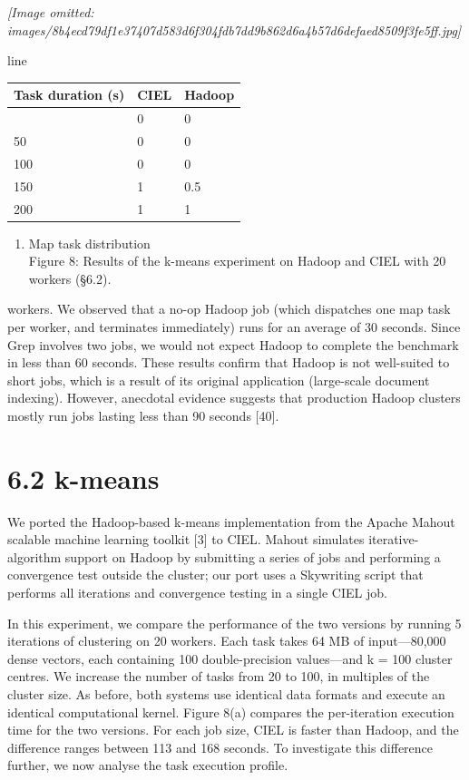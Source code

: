 \documentclass[
]{article}
\newcounter{none} %
\providecommand{\tightlist}{%
  \setlength{\itemsep}{0pt}\setlength{\parskip}{0pt}}
\begin{document}
\textit{[Image omitted: images/8b4ecd79df1e37407d583d6f304fdb7dd9b862d6a4b57d6defaed8509f3fe5ff.jpg]}

line

{\def\LTcaptype{none} %
\begin{longtable}[]{@{}lll@{}}
\toprule\noalign{}
Task duration (s) & CIEL & Hadoop \\
\midrule\noalign{}
\endhead
\bottomrule\noalign{}
\endlastfoot
0 & 0 & 0 \\
50 & 0 & 0 \\
100 & 0 & 0 \\
150 & 1 & 0.5 \\
200 & 1 & 1 \\
\end{longtable}
}

\begin{enumerate}
\def\labelenumi{(\alph{enumi})}
\setcounter{enumi}{2}
\tightlist
\item
  Map task distribution\\
  Figure 8: Results of the k-means experiment on Hadoop and CIEL with 20
  workers (§6.2).
\end{enumerate}

workers. We observed that a no-op Hadoop job (which dispatches one map
task per worker, and terminates immediately) runs for an average of 30
seconds. Since Grep involves two jobs, we would not expect Hadoop to
complete the benchmark in less than 60 seconds. These results confirm
that Hadoop is not well-suited to short jobs, which is a result of its
original application (large-scale document indexing). However, anecdotal
evidence suggests that production Hadoop clusters mostly run jobs
lasting less than 90 seconds {[}40{]}.

\section{6.2 k-means}\label{k-means}

We ported the Hadoop-based k-means implementation from the Apache Mahout
scalable machine learning toolkit {[}3{]} to CIEL. Mahout simulates
iterative-algorithm support on Hadoop by submitting a series of jobs and
performing a convergence test outside the cluster; our port uses a
Skywriting script that performs all iterations and convergence testing
in a single CIEL job.

In this experiment, we compare the performance of the two versions by
running 5 iterations of clustering on 20 workers. Each task takes 64 MB
of input---80,000 dense vectors, each containing 100 double-precision
values---and k = 100 cluster centres. We increase the number of tasks
from 20 to 100, in multiples of the cluster size. As before, both
systems use identical data formats and execute an identical
computational kernel. Figure 8(a) compares the per-iteration execution
time for the two versions. For each job size, CIEL is faster than
Hadoop, and the difference ranges between 113 and 168 seconds. To
investigate this difference further, we now analyse the task execution
profile.
\end{document}
